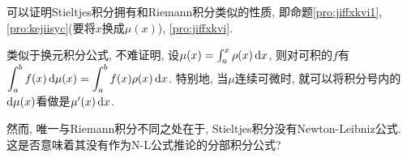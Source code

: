 可以证明Stieltjes积分拥有和Riemann积分类似的性质, 即命题\ref{pro:jiffxkvi1}, \ref{pro:kejiisyc}(要将$x$换成$\mu (x)$), \ref{pro:jiffxkvi}. 

类似于换元积分公式, 不难证明, 设$\mu (x) = \int_a^x \rho (x)\mathop{}\!\mathrm{d} x$, 则对可积的$f$有$\displaystyle \int_a^b f(x) \mathop{}\!\mathrm{d} \mu (x) = \int_a^b f(x) \rho (x) \mathop{}\!\mathrm{d} x$. 特别地, 当$\mu$连续可微时, 就可以将积分号内的$\mathop{}\!\mathrm{d} \mu (x)$看做是$\mu '(x) \mathop{}\!\mathrm{d} x$. 

然而, 唯一与Riemann积分不同之处在于, Stieltjes积分没有Newton-Leibniz公式. 这是否意味着其没有作为N-L公式推论的分部积分公式? 











